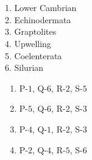 \documentclass[12pt,fleqn]{article}
\theoremstyle{remark}
\begin{document}
\begin{enumerate}[label=Q.\arabic*.]
\begin{multicols}{2}
            \columnbreak
            
            \\\\
            1. Lower Cambrian\\
            2. Echinodermata\\
            3. Graptolites\\
            4. Upwelling\\
            5. Coelenterata\\
            6. Silurian

        \end{multicols}
            \begin {enumerate}
                
                    \item P-$1$, Q-$6$, R-$2$, S-$5$
                    \item P-$5$, Q-$6$, R-$2$, S-$3$
                    \item P-$4$, Q-$1$, R-$2$, S-$3$
                    \item P-$2$, Q-$4$, R-$5$, S-$6$
                

\end{enumerate}
\end{enumerate}
\end{document}
